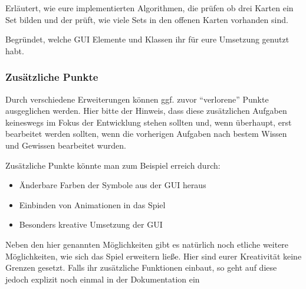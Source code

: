 \documentclass[a4paper,
			   fontsize=12pt]{article}
\begin{document}
Erläutert, wie eure implementierten Algorithmen, die prüfen ob drei Karten ein Set bilden und der prüft, wie viele Sets in den offenen Karten vorhanden sind.

Begründet, welche GUI Elemente und Klassen ihr für eure Umsetzung genutzt habt.

\subsubsection*{Zusätzliche Punkte}
Durch verschiedene Erweiterungen können ggf. zuvor "`verlorene"' Punkte ausgeglichen werden. Hier bitte der Hinweis, dass diese zusätzlichen Aufgaben keineswegs im Fokus der Entwicklung
stehen sollten und, wenn überhaupt, erst bearbeitet werden sollten, wenn die vorherigen Aufgaben nach bestem Wissen und Gewissen bearbeitet wurden.

Zusätzliche Punkte könnte man zum Beispiel erreich durch:
\begin{itemize}
	\item Änderbare Farben der Symbole aus der GUI heraus
	\item Einbinden von Animationen in das Spiel
	\item Besonders kreative Umsetzung der GUI
\end{itemize}
Neben den hier genannten Möglichkeiten gibt es natürlich noch etliche weitere Möglichkeiten, wie sich das Spiel erweitern ließe. Hier sind eurer Kreativität keine Grenzen gesetzt. Falls ihr 
zusätzliche Funktionen einbaut, so geht auf diese jedoch explizit noch einmal in der Dokumentation ein
\end{document}
